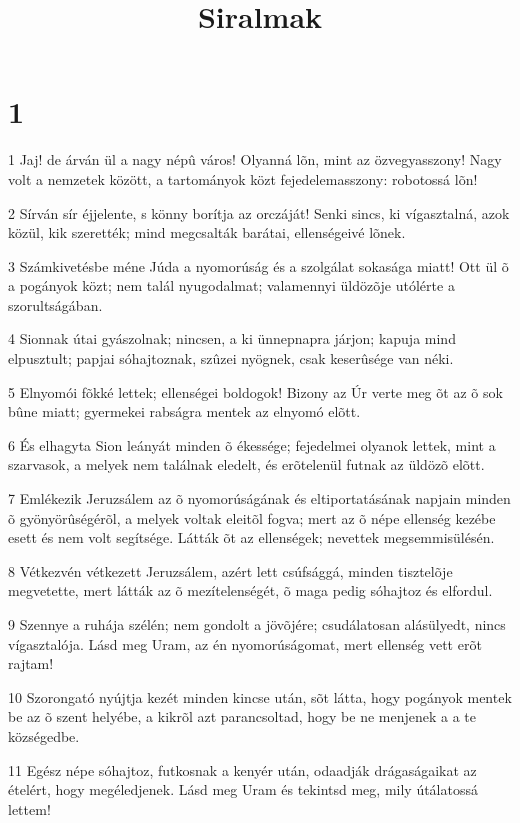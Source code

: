 

\title{Siralmak}


\chapter{1}

\par 1 Jaj! de árván ül a nagy népû város! Olyanná lõn, mint az özvegyasszony! Nagy volt a nemzetek között, a tartományok közt fejedelemasszony: robotossá lõn!
\par 2 Sírván sír éjjelente, s könny borítja az orczáját! Senki sincs, ki vígasztalná, azok közül, kik szerették; mind megcsalták barátai, ellenségeivé lõnek.
\par 3 Számkivetésbe méne Júda a nyomorúság és a szolgálat sokasága miatt! Ott ül õ a pogányok közt; nem talál nyugodalmat; valamennyi üldözõje utólérte a szorultságában.
\par 4 Sionnak útai gyászolnak; nincsen, a ki ünnepnapra járjon; kapuja mind elpusztult; papjai sóhajtoznak, szûzei nyögnek, csak keserûsége van néki.
\par 5 Elnyomói fõkké lettek; ellenségei boldogok! Bizony az Úr verte meg õt az õ sok bûne miatt; gyermekei rabságra mentek az elnyomó elõtt.
\par 6 És elhagyta Sion leányát minden õ ékessége; fejedelmei olyanok lettek, mint a szarvasok, a melyek nem találnak eledelt, és erõtelenül futnak az üldözõ elõtt.
\par 7 Emlékezik Jeruzsálem az õ nyomorúságának és eltiportatásának napjain minden õ gyönyörûségérõl, a melyek voltak eleitõl fogva; mert az õ népe ellenség kezébe esett és nem volt segítsége. Látták õt az ellenségek; nevettek megsemmisülésén.
\par 8 Vétkezvén vétkezett Jeruzsálem, azért lett csúfsággá, minden tisztelõje megvetette, mert látták az õ mezítelenségét, õ maga pedig sóhajtoz és elfordul.
\par 9 Szennye a ruhája szélén; nem gondolt a jövõjére; csudálatosan alásülyedt, nincs vígasztalója. Lásd meg Uram, az én nyomorúságomat, mert ellenség vett erõt rajtam!
\par 10 Szorongató nyújtja kezét minden kincse után, sõt látta, hogy pogányok mentek be az õ szent helyébe, a kikrõl azt parancsoltad, hogy be ne menjenek a a te községedbe.
\par 11 Egész népe sóhajtoz, futkosnak a kenyér után, odaadják drágaságaikat az ételért, hogy megéledjenek. Lásd meg Uram és tekintsd meg, mily útálatossá lettem!
